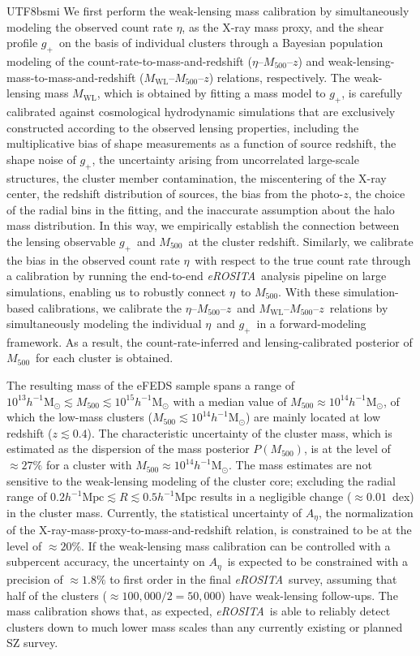 \documentclass[longauth]{aa}
\newcommand{\Msunh}{\ensuremath{h^{-1}\mathrm{M}_{\odot}}}
\newcommand{\Mpch}{\ensuremath{h^{-1}\mathrm{Mpc}}}
\newcommand{\Mfiveoo}{\ensuremath{M_{500}}}
\newcommand{\redshift}{\ensuremath{z}}
\newcommand{\eROSITA}{\emph{eROSITA}}
\newcommand{\gshear}{\ensuremath{g_{+}}}
\newcommand{\Mwl}{\ensuremath{M_{\mathrm{WL}}}}
\newcommand{\rate}{\ensuremath{\eta}}
\newcommand{\Aeta}{\ensuremath{A_{\eta}}}
\newcommand{\percent}{\ensuremath{\%}}
\begin{document}
\begin{CJK*}{UTF8}{bsmi}
We first perform the weak-lensing mass calibration by simultaneously modeling the observed count rate \rate, as the X-ray mass proxy, and the shear profile \gshear\ on the basis of individual clusters through a Bayesian population modeling of the count-rate-to-mass-and-redshift (\rate--\Mfiveoo--\redshift) and weak-lensing-mass-to-mass-and-redshift (\Mwl--\Mfiveoo--\redshift) relations, respectively.
The weak-lensing mass \Mwl, which is obtained by fitting a mass model to \gshear, is carefully calibrated against cosmological hydrodynamic simulations that are exclusively constructed according to the observed lensing properties, including the multiplicative bias of shape measurements as a function of source redshift, the shape noise of  \gshear, the uncertainty arising from uncorrelated large-scale structures, the cluster member contamination, the miscentering of the X-ray center, the redshift distribution of sources, the bias from the photo-\redshift, the choice of the radial bins in the fitting, and the inaccurate assumption about the halo mass distribution.
In this way, we empirically establish the connection between the lensing observable \gshear\ and \Mfiveoo\ at the cluster redshift. 
Similarly, we calibrate the bias in the observed count rate \rate\ with respect to the true count rate through a calibration by running the end-to-end \eROSITA\ analysis pipeline on large simulations, enabling us to robustly connect \rate\ to \Mfiveoo.
With these simulation-based calibrations, we calibrate the \rate--\Mfiveoo--\redshift\ and \Mwl--\Mfiveoo--\redshift\ relations by simultaneously modeling 
the individual \rate\ and \gshear\ in a forward-modeling framework.
As a result, the count-rate-inferred and lensing-calibrated posterior of \Mfiveoo\ for each cluster is obtained.


The resulting mass of the eFEDS sample spans a range of $10^{13}\Msunh\lesssim\Mfiveoo\lesssim10^{15}\Msunh$ with a median value of $\Mfiveoo\approx10^{14}\Msunh$, of which the low-mass clusters ($\Mfiveoo\lesssim10^{14}\Msunh$) are mainly located at low redshift ($\redshift\lesssim0.4$). 
The characteristic uncertainty of the cluster mass, which is estimated as the dispersion of the mass posterior $P(\Mfiveoo)$, is at the level of $\approx27\percent$ for a cluster with $\Mfiveoo\approx10^{14}\Msunh$.
The mass estimates are not sensitive to the weak-lensing modeling of the cluster core; excluding the radial range of $0.2\Mpch\lesssim R \lesssim0.5\Mpch$ results in a negligible change ($\approx0.01$~dex) in the cluster mass.
Currently, the statistical uncertainty of \Aeta, the normalization of the X-ray-mass-proxy-to-mass-and-redshift relation, is constrained to be at the level of 
$\approx20\percent$.
If the weak-lensing mass calibration can be controlled with a subpercent accuracy, the uncertainty on \Aeta\ is expected to be constrained with a precision of $\approx1.8\percent$ to first order in the final \eROSITA\ survey, assuming that half of the clusters ($\approx100,000/2=50,000$) have weak-lensing follow-ups.
The mass calibration shows that, as expected, \eROSITA\ is able to reliably detect clusters down to much lower mass scales than any currently existing or planned SZ survey.


\end{CJK*}
\end{document}
